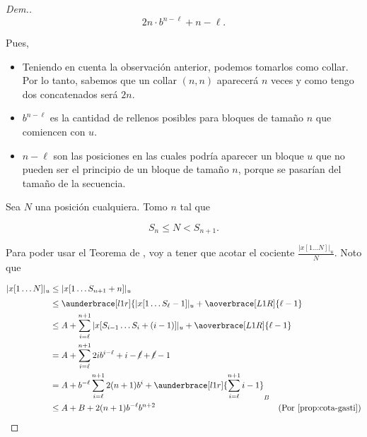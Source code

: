 \documentclass{article}
\theoremstyle{definition} %
\begin{document}
\begin{proof}[Dem.]
    \[
        2n\cdot b^{n-\ell} + n - \ell.
    \]

    Pues,

    \begin{itemize}
        \item Teniendo en cuenta la observación anterior, podemos tomarlos como
        collar. Por lo tanto, sabemos que un collar $(n, n)$ aparecerá $n$ veces
        y como tengo dos concatenados será $2n$.
        \item $b^{n-\ell}$ es la cantidad de rellenos posibles para bloques de
        tamaño $n$ que comiencen con $u$.
        \item $n - \ell$ son las posiciones en las cuales podría aparecer un
        bloque $u$ que no pueden ser el principio de un bloque de tamaño $n$,
        porque se pasarían del tamaño de la secuencia.
    \end{itemize}

    Sea $N$ una posición cualquiera. Tomo $n$ tal que

    \[
        S_n \leq N < S_{n+1}.
    \]

    Para poder usar el Teorema de , voy a tener
    que acotar el cociente $\frac{|x[1\dots N]|_u}{N}$. Noto que

    \begin{align*}
        |x[1\dots N]|_u
            &\leq |x[1\dots S_{n+1}+n]|_u\\
            &\leq \aunderbrace[l1r]{
                |x[1\dots S_{\ell} - 1]|_u + 
                \aoverbrace[L1R]{\ell - 1}
                    ^{\hidewidth\text{entre bloques}\hidewidth}}_{A}
                +|x[S_{\ell}\dots S_{n+1}+n]|_u\\
            &\leq A + \sum_{i=\ell}^{n+1} |x[S_{i-1} \dots S_i+(i-1)]|_u + \aoverbrace[L1R]{\ell - 1}^{\hidewidth\text{entre bloques}\hidewidth} \\
            &= A + \sum_{i=\ell}^{n+1} 2ib^{i - \ell} + i - \cancel{\ell} + \cancel{\ell} - 1 \\
            &= A + b^{-\ell}\sum_{i=\ell}^{n+1} 2(n+1) b^{i} + 
                \aunderbrace[l1r]{\sum_{i=\ell}^{n+1} i - 1}_{B}\\
            &\leq A + B + 2(n+1) b^{-\ell} b^{n+2} & \text{(Por \ref{prop:cota-gasti})}
    \end{align*}


\end{proof}
\end{document}
